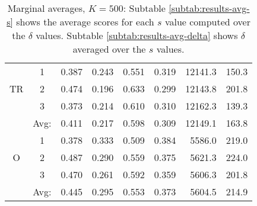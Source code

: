 \begin{table}[htb]
{\begin{tabular}{cc|ccccrr}
\multirow{ 3}{*}{TR} & 1 & 0.387 & 0.243 & 0.551 & 0.319 & 12141.3 & 150.3 \\
& 2 & 0.474 & 0.196 & 0.633 & 0.299 & 12143.8 & 201.8 \\
& 3 & 0.373 & 0.214 & 0.610 & 0.310 & 12162.3 & 139.3 \\ \cline{2-8}
& Avg: & 0.411 & 0.217 & 0.598 & 0.309 & 12149.1 & 163.8 \\ \hline
\multirow{ 3}{*}{O} & 1 & 0.378 & 0.333 & 0.509 & 0.384 & 5586.0 & 219.0 \\
& 2 & 0.487 & 0.290 & 0.559 & 0.375 & 5621.3 & 224.0 \\
& 3 & 0.470 & 0.261 & 0.592 & 0.359 & 5606.3 & 201.8 \\ \cline{2-8}
& Avg: & 0.445 & 0.295 & 0.553 & 0.373 & 5604.5 & 214.9 \\  \hline
\end{tabular}
}
\caption{Marginal averages, $K=500$: Subtable \ref{subtab:results-avg-s} shows the average scores for each $s$ value computed over the $\delta$ values. Subtable \ref{subtab:results-avg-delta} shows $\delta$ averaged over the $s$ values.}
\label{tab:marginal-avgs-500}
\end{table}

